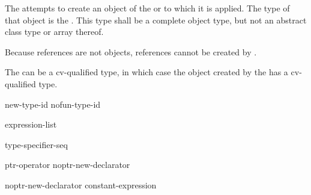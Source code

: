 \pnum
{}%
%
%
%
%
%
%
%
The  attempts to create an object of the
 or  to which
it is applied. The type of that object is the .
%
This type shall be a complete object type,
but not an abstract class type or array
thereof.
\begin{note}
Because references are not objects, references cannot be created by
.
\end{note}
\begin{note}
The  can be a cv-qualified type, in which case the
object created by the  has a cv-qualified type.
\end{note}

\begin{bnf}
\br
    \opt{\terminal{::}}   new-type-id  \br
    \opt{\terminal{::}}   \terminal{(} nofun-type-id \terminal{)} 
\end{bnf}

%
%
\begin{bnf}
\br
    \terminal{(} expression-list \terminal{)}
\end{bnf}

\begin{bnf}
\br
    type-specifier-seq 
\end{bnf}

\begin{bnf}
\br
    ptr-operator  \br
    noptr-new-declarator
\end{bnf}

\begin{bnf}
\br
    \terminal{[}  \terminal{]} \br
    noptr-new-declarator \terminal{[} constant-expression \terminal{]} 
\end{bnf}

